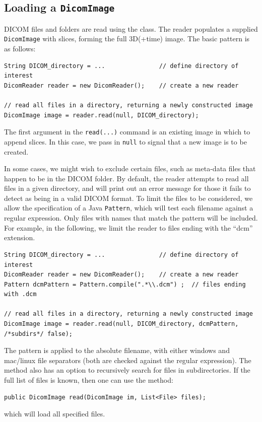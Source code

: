 \subsection{Loading a \texttt{DicomImage} \label{sec:dicom:loading}}

DICOM files and folders are read using the  class.  The 
reader populates a supplied \lstinline{DicomImage} with slices, forming the full 3D(+time)
image. The basic pattern is as follows:
\begin{lstlisting}[]
String DICOM_directory = ...               // define directory of interest
DicomReader reader = new DicomReader();    // create a new reader

// read all files in a directory, returning a newly constructed image
DicomImage image = reader.read(null, DICOM_directory);  
\end{lstlisting}
The first argument in the \lstinline{read(...)} command is an existing image in which to append slices.
In this case, we pass in \lstinline{null} to signal that a new image is to be created.

In some cases, we might wish to exclude certain files, such as meta-data files that
happen to be in the DICOM folder.  By default, the reader attempts to read
all files in a given directory, and will print out an error message for those it fails
to detect as being in a valid DICOM format.  To limit the files to be considered,
we allow the specification of a Java \lstinline{Pattern}, which will test
each filename against a regular expression.  Only files with names that match
the pattern will be included.  For example, in the following, we limit the reader
to files ending with the ``dcm'' extension.
\begin{lstlisting}[]
String DICOM_directory = ...               // define directory of interest
DicomReader reader = new DicomReader();    // create a new reader
Pattern dcmPattern = Pattern.compile(".*\\.dcm") ;  // files ending with .dcm

// read all files in a directory, returning a newly constructed image
DicomImage image = reader.read(null, DICOM_directory, dcmPattern, /*subdirs*/ false);  
\end{lstlisting}
The pattern is applied to the absolute filename, with either windows and mac/linux file
separators (both are checked against the regular expression).  The method also has
an option to recursively search for files in subdirectories.  If the full list of files is 
known, then one can use the method:
\begin{lstlisting}[]
public DicomImage read(DicomImage im, List<File> files);
\end{lstlisting}
which will load all specified files.

